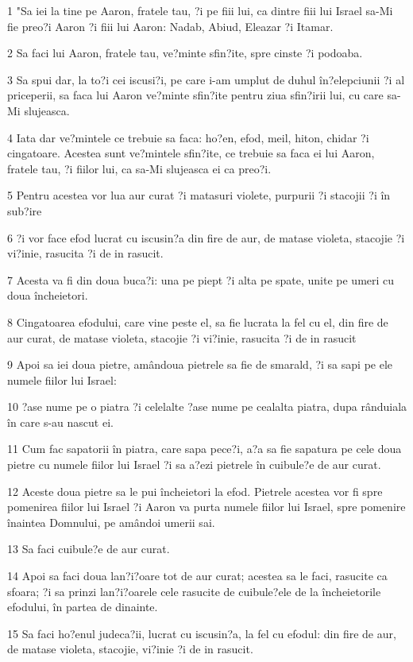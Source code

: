 \par 1 "Sa iei la tine pe Aaron, fratele tau, ?i pe fiii lui, ca dintre fiii lui Israel sa-Mi fie preo?i Aaron ?i fiii lui Aaron: Nadab, Abiud, Eleazar ?i Itamar.
\par 2 Sa faci lui Aaron, fratele tau, ve?minte sfin?ite, spre cinste ?i podoaba.
\par 3 Sa spui dar, la to?i cei iscusi?i, pe care i-am umplut de duhul în?elepciunii ?i al priceperii, sa faca lui Aaron ve?minte sfin?ite pentru ziua sfin?irii lui, cu care sa-Mi slujeasca.
\par 4 Iata dar ve?mintele ce trebuie sa faca: ho?en, efod, meil, hiton, chidar ?i cingatoare. Acestea sunt ve?mintele sfin?ite, ce trebuie sa faca ei lui Aaron, fratele tau, ?i fiilor lui, ca sa-Mi slujeasca ei ca preo?i.
\par 5 Pentru acestea vor lua aur curat ?i matasuri violete, purpurii ?i stacojii ?i în sub?ire
\par 6 ?i vor face efod lucrat cu iscusin?a din fire de aur, de matase violeta, stacojie ?i vi?inie, rasucita ?i de in rasucit.
\par 7 Acesta va fi din doua buca?i: una pe piept ?i alta pe spate, unite pe umeri cu doua încheietori.
\par 8 Cingatoarea efodului, care vine peste el, sa fie lucrata la fel cu el, din fire de aur curat, de matase violeta, stacojie ?i vi?inie, rasucita ?i de in rasucit
\par 9 Apoi sa iei doua pietre, amândoua pietrele sa fie de smarald, ?i sa sapi pe ele numele fiilor lui Israel:
\par 10 ?ase nume pe o piatra ?i celelalte ?ase nume pe cealalta piatra, dupa rânduiala în care s-au nascut ei.
\par 11 Cum fac sapatorii în piatra, care sapa pece?i, a?a sa fie sapatura pe cele doua pietre cu numele fiilor lui Israel ?i sa a?ezi pietrele în cuibule?e de aur curat.
\par 12 Aceste doua pietre sa le pui încheietori la efod. Pietrele acestea vor fi spre pomenirea fiilor lui Israel ?i Aaron va purta numele fiilor lui Israel, spre pomenire înaintea Domnului, pe amândoi umerii sai.
\par 13 Sa faci cuibule?e de aur curat.
\par 14 Apoi sa faci doua lan?i?oare tot de aur curat; acestea sa le faci, rasucite ca sfoara; ?i sa prinzi lan?i?oarele cele rasucite de cuibule?ele de la încheietorile efodului, în partea de dinainte.
\par 15 Sa faci ho?enul judeca?ii, lucrat cu iscusin?a, la fel cu efodul: din fire de aur, de matase violeta, stacojie, vi?inie ?i de in rasucit.
